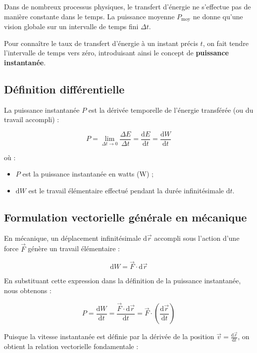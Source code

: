 \documentclass[11pt,openany]{book}
\begin{document}
Dans de nombreux processus physiques, le transfert d'énergie ne s'effectue pas de manière constante dans le temps. La puissance moyenne $P_{\mathrm{moy}}$ ne donne qu'une vision globale sur un intervalle de temps fini $\Delta t$. 

Pour connaître le taux de transfert d'énergie à un instant précis $t$, on fait tendre l'intervalle de temps vers zéro, introduisant ainsi le concept de \textbf{puissance instantanée}.

\subsection*{Définition différentielle}

La puissance instantanée $P$ est la dérivée temporelle de l'énergie transférée (ou du travail accompli) :

\[
\boxed{P = \lim_{\Delta t \to 0} \frac{\Delta E}{\Delta t} = \frac{\mathrm{d}E}{\mathrm{d}t} = \frac{\mathrm{d}W}{\mathrm{d}t}}
\]

où :
\begin{itemize}
    \item $P$ est la puissance instantanée en watts ($\mathrm{W}$) ;
    \item $\mathrm{d}W$ est le travail élémentaire effectué pendant la durée infinitésimale $\mathrm{d}t$.
\end{itemize}

\subsection*{Formulation vectorielle générale en mécanique}

En mécanique, un déplacement infinitésimale $\mathrm{d}\vec{r}$ accompli sous l'action d'une force $\vec{F}$ génère un travail élémentaire :

\[
\mathrm{d}W = \vec{F} \cdot \mathrm{d}\vec{r}
\]

En substituant cette expression dans la définition de la puissance instantanée, nous obtenons :

\[
P = \frac{\mathrm{d}W}{\mathrm{d}t} = \frac{\vec{F} \cdot \mathrm{d}\vec{r}}{\mathrm{d}t} = \vec{F} \cdot \left( \frac{\mathrm{d}\vec{r}}{\mathrm{d}t} \right)
\]

Puisque la vitesse instantanée est définie par la dérivée de la position $\vec{v} = \frac{\mathrm{d}\vec{r}}{\mathrm{d}t}$, on obtient la relation vectorielle fondamentale :
\end{document}
